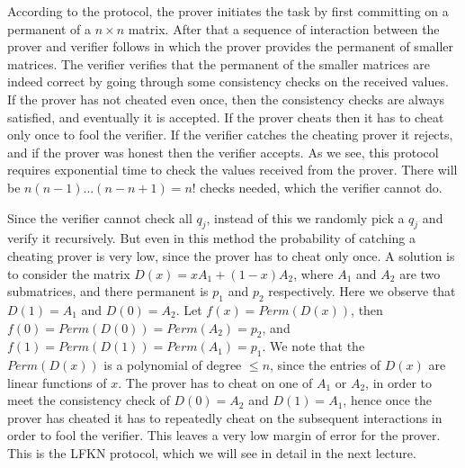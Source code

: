 According to the protocol, the prover initiates the task by first committing on a permanent of a $n
\times n$ matrix. After that a sequence of interaction between the prover and verifier follows in
which the prover provides the permanent of smaller matrices. The verifier verifies that the
permanent of the smaller matrices are indeed correct by going through some consistency checks on the
received values. If the prover has not cheated even once, then the consistency checks are always
satisfied, and eventually it is accepted. If the prover cheats then it has to cheat only once to
fool the verifier. If the verifier catches the cheating prover it rejects, and if the prover was
honest then the verifier accepts. As we see, this protocol requires exponential time to check the
values received from the prover. There will be $n(n-1)...(n - n + 1) = n!$ checks needed, which the
verifier cannot do. 

Since the verifier cannot check all $q_j$, instead of this we randomly pick a $q_j$ and verify it
recursively. But even in this method the probability of catching a cheating prover is very low,
since the prover has to cheat only once. A solution is to consider the matrix $D(x) = xA_1 + (1 -
x)A_2$, where $A_1$ and $A_2$ are two submatrices, and there permanent is $p_1$ and $p_2$
respectively. Here we observe that $D(1) = A_1$ and $D(0) = A_2$. Let $f(x) = Perm(D(x))$, then
$f(0) = Perm(D(0)) = Perm(A_2) = p_2$, and $f(1) = Perm(D(1)) = Perm(A_1) = p_1$. We note that the
$Perm(D(x))$ is a polynomial of degree $\leq n$, since the entries of $D(x)$ are linear functions
of $x$. The prover has to cheat on one of $A_1$ or $A_2$, in order to meet the consistency check of
$D(0) = A_2$ and $D(1) = A_1$, hence once the prover has cheated it has to repeatedly cheat on the
subsequent interactions in order to fool the verifier. This leaves a very low margin of error for
the prover. This is the LFKN protocol, which we will see in detail in the next lecture.
